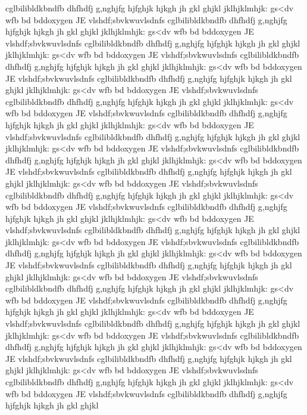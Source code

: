 cglbilibldkbndfb
dhfhdfj
g,nghjfg
hjfghjk
hjkgh
jh
gkl
ghjkl
jklhjklmhjk:
gs<dv
wfb
bd
bddoxygen
JE vlshdf;sbvkwuvlsdnfs
cglbilibldkbndfb
dhfhdfj
g,nghjfg
hjfghjk
hjkgh
jh
gkl
ghjkl
jklhjklmhjk:
gs<dv
wfb
bd
bddoxygen
JE vlshdf;sbvkwuvlsdnfs
cglbilibldkbndfb
dhfhdfj
g,nghjfg
hjfghjk
hjkgh
jh
gkl
ghjkl
jklhjklmhjk:
gs<dv
wfb
bd
bddoxygen
JE vlshdf;sbvkwuvlsdnfs
cglbilibldkbndfb
dhfhdfj
g,nghjfg
hjfghjk
hjkgh
jh
gkl
ghjkl
jklhjklmhjk:
gs<dv
wfb
bd
bddoxygen
JE vlshdf;sbvkwuvlsdnfs
cglbilibldkbndfb
dhfhdfj
g,nghjfg
hjfghjk
hjkgh
jh
gkl
ghjkl
jklhjklmhjk:
gs<dv
wfb
bd
bddoxygen
JE vlshdf;sbvkwuvlsdnfs
cglbilibldkbndfb
dhfhdfj
g,nghjfg
hjfghjk
hjkgh
jh
gkl
ghjkl
jklhjklmhjk:
gs<dv
wfb
bd
bddoxygen
JE vlshdf;sbvkwuvlsdnfs
cglbilibldkbndfb
dhfhdfj
g,nghjfg
hjfghjk
hjkgh
jh
gkl
ghjkl
jklhjklmhjk:
gs<dv
wfb
bd
bddoxygen
JE vlshdf;sbvkwuvlsdnfs
cglbilibldkbndfb
dhfhdfj
g,nghjfg
hjfghjk
hjkgh
jh
gkl
ghjkl
jklhjklmhjk:
gs<dv
wfb
bd
bddoxygen
JE vlshdf;sbvkwuvlsdnfs
cglbilibldkbndfb
dhfhdfj
g,nghjfg
hjfghjk
hjkgh
jh
gkl
ghjkl
jklhjklmhjk:
gs<dv
wfb
bd
bddoxygen
JE vlshdf;sbvkwuvlsdnfs
cglbilibldkbndfb
dhfhdfj
g,nghjfg
hjfghjk
hjkgh
jh
gkl
ghjkl
jklhjklmhjk:
gs<dv
wfb
bd
bddoxygen
JE vlshdf;sbvkwuvlsdnfs
cglbilibldkbndfb
dhfhdfj
g,nghjfg
hjfghjk
hjkgh
jh
gkl
ghjkl
jklhjklmhjk:
gs<dv
wfb
bd
bddoxygen
JE vlshdf;sbvkwuvlsdnfs
cglbilibldkbndfb
dhfhdfj
g,nghjfg
hjfghjk
hjkgh
jh
gkl
ghjkl
jklhjklmhjk:
gs<dv
wfb
bd
bddoxygen
JE vlshdf;sbvkwuvlsdnfs
cglbilibldkbndfb
dhfhdfj
g,nghjfg
hjfghjk
hjkgh
jh
gkl
ghjkl
jklhjklmhjk:
gs<dv
wfb
bd
bddoxygen
JE vlshdf;sbvkwuvlsdnfs
cglbilibldkbndfb
dhfhdfj
g,nghjfg
hjfghjk
hjkgh
jh
gkl
ghjkl
jklhjklmhjk:
gs<dv
wfb
bd
bddoxygen
JE vlshdf;sbvkwuvlsdnfs
cglbilibldkbndfb
dhfhdfj
g,nghjfg
hjfghjk
hjkgh
jh
gkl
ghjkl
jklhjklmhjk:
gs<dv
wfb
bd
bddoxygen
JE vlshdf;sbvkwuvlsdnfs
cglbilibldkbndfb
dhfhdfj
g,nghjfg
hjfghjk
hjkgh
jh
gkl
ghjkl
jklhjklmhjk:
gs<dv
wfb
bd
bddoxygen
JE vlshdf;sbvkwuvlsdnfs
cglbilibldkbndfb
dhfhdfj
g,nghjfg
hjfghjk
hjkgh
jh
gkl
ghjkl
jklhjklmhjk:
gs<dv
wfb
bd
bddoxygen
JE vlshdf;sbvkwuvlsdnfs
cglbilibldkbndfb
dhfhdfj
g,nghjfg
hjfghjk
hjkgh
jh
gkl
ghjkl
jklhjklmhjk:
gs<dv
wfb
bd
bddoxygen
JE vlshdf;sbvkwuvlsdnfs
cglbilibldkbndfb
dhfhdfj
g,nghjfg
hjfghjk
hjkgh
jh
gkl
ghjkl
jklhjklmhjk:
gs<dv
wfb
bd
bddoxygen
JE vlshdf;sbvkwuvlsdnfs
cglbilibldkbndfb
dhfhdfj
g,nghjfg
hjfghjk
hjkgh
jh
gkl
ghjkl
jklhjklmhjk:
gs<dv
wfb
bd
bddoxygen
JE vlshdf;sbvkwuvlsdnfs
cglbilibldkbndfb
dhfhdfj
g,nghjfg
hjfghjk
hjkgh
jh
gkl
ghjkl
jklhjklmhjk:
gs<dv
wfb
bd
bddoxygen
JE vlshdf;sbvkwuvlsdnfs
cglbilibldkbndfb
dhfhdfj
g,nghjfg
hjfghjk
hjkgh
jh
gkl
ghjkl
